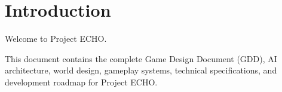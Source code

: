 \chapter{Introduction}

Welcome to Project ECHO.

This document contains the complete Game Design Document (GDD), AI architecture, world design, gameplay systems, technical specifications, and development roadmap for Project ECHO.
